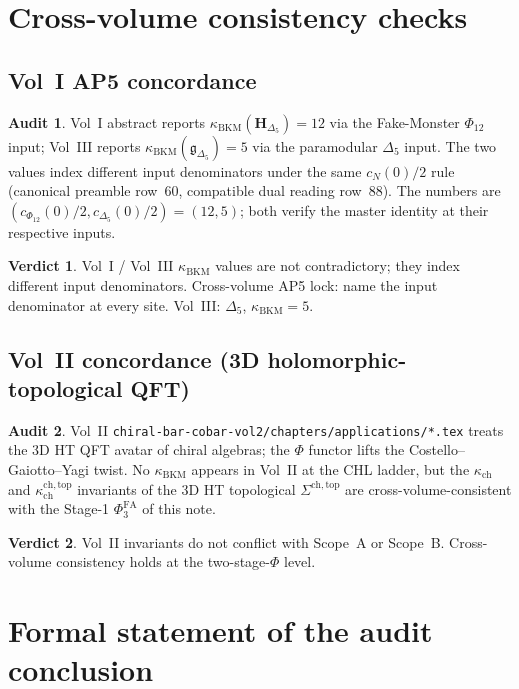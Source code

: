 \documentclass[11pt]{article}
\providecommand{\kBKM}{\kappa_{\mathrm{BKM}}}
\providecommand{\kch}{\kappa_{\mathrm{ch}}}
\providecommand{\gDelta}{\mathfrak{g}_{\Delta_5}}
\providecommand{\PhiFA}{\Phi^{\mathrm{FA}}}
\theoremstyle{definition}
\newtheorem*{audit}{Audit}
\newtheorem*{verdict}{Verdict}
\begin{document}
\section{Cross-volume consistency checks}
\label{sec:cross-volume}

\subsection{Vol~I AP5 concordance}

\begin{audit}
Vol~I abstract reports $\kBKM(\mathbf H_{\Delta_5}) = 12$ via the
Fake-Monster $\Phi_{12}$ input; Vol~III reports
$\kBKM(\gDelta) = 5$ via the paramodular $\Delta_5$ input.
The two values index different input denominators under the same
$c_N(0)/2$ rule (canonical preamble row~60, compatible dual reading
row~88). The numbers are $(c_{\Phi_{12}}(0)/2, c_{\Delta_5}(0)/2) =
(12, 5)$; both verify the master identity at their respective inputs.
\end{audit}

\begin{verdict}
Vol~I / Vol~III $\kBKM$ values are not contradictory; they index
different input denominators. Cross-volume AP5 lock: name the input
denominator at every site. Vol~III: $\Delta_5$, $\kBKM = 5$.
\end{verdict}

\subsection{Vol~II concordance (3D holomorphic-topological QFT)}

\begin{audit}
Vol~II
\texttt{chiral-bar-cobar-vol2/chapters/applications/*.tex}
treats the 3D HT QFT avatar of chiral algebras; the $\Phi$ functor
lifts the Costello--Gaiotto--Yagi twist. No $\kBKM$ appears in Vol~II
at the CHL ladder, but the $\kch$ and
$\kch^{\mathrm{ch}, \mathrm{top}}$ invariants of the 3D HT topological
$\Sigma^{\mathrm{ch}, \mathrm{top}}$ are cross-volume-consistent with
the Stage-1 $\PhiFA_3$ of this note.
\end{audit}

\begin{verdict}
Vol~II invariants do not conflict with Scope~A or Scope~B.
Cross-volume consistency holds at the two-stage-$\Phi$ level.
\end{verdict}

\section{Formal statement of the audit conclusion}
\label{sec:audit-conclusion}
\end{document}
